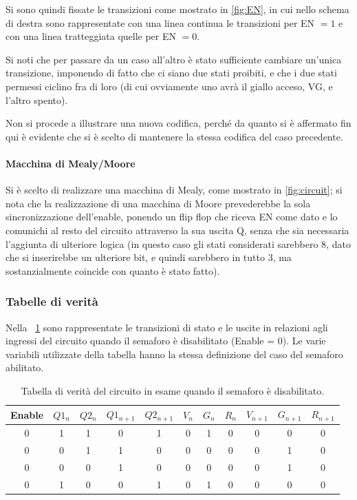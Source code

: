 \documentclass[a4paper,10pt]{article}
\begin{document}
Si sono quindi fissate le transizioni come mostrato in \cref{fig:EN}, in cui nello schema di destra sono rappresentate con una linea continua le transizioni per EN $ = 1 $ e con una linea tratteggiata quelle per EN $ = 0 $.
\newline

Si noti che per passare da un caso all'altro è stato sufficiente cambiare un'unica transizione, imponendo di fatto che ci siano due stati proibiti, e che i due stati permessi ciclino fra di loro (di cui ovviamente uno avrà il giallo acceso, VG, e l'altro spento).
\newline

Non si procede a illustrare una nuova codifica, perché da quanto si è affermato fin qui è evidente che si è scelto di mantenere la stessa codifica del caso precedente.

\paragraph{Macchina di Mealy/Moore} Si è scelto di realizzare una macchina di Mealy, come mostrato in \cref{fig:circuit}; si nota che la realizzazione di una macchina di Moore prevederebbe la sola sincronizzazione dell'enable, ponendo un flip flop che riceva EN come dato e lo comunichi al resto del circuito attraverso la sua uscita Q, senza che sia necessaria l'aggiunta di ulteriore logica (in questo caso gli stati considerati sarebbero $ 8 $, dato che si inserirebbe un ulteriore bit, e quindi sarebbero in tutto $ 3 $, ma sostanzialmente coincide con quanto è stato fatto).

\subsubsection{Tabelle di verità}

Nella \tablename{~\ref{tab:lampe}} sono rappresentate le transizioni di stato e le uscite in relazioni agli ingressi del circuito quando il semaforo è disabilitato (Enable = 0). Le varie variabili utilizzate della tabella hanno la stessa definizione del caso del semaforo abilitato.
 
 \begin{table}[H]
	\centering
	\begin{tabular}{c|cc|cc|ccc|ccc}
	\hline
	Enable & $Q1_n$ & $Q2_n$ & $Q1_{n+1}$ & $Q2_{n+1}$ & $V_n$ & $G_n$ & $R_n$ & $V_{n+1}$ & $G_{n+1}$ & $R_{n+1}$ \\
	\hline
	0 & 1 & 1 & 0 & 1 & 0 & 1 & 0 & 0 & 0 & 0 \\
	0 & 0 & 1 & 1 & 0 & 0 & 0 & 0 & 0 & 1 & 0 \\
	0 & 0 & 0 & 1 & 0 & 0 & 0 & 0 & 0 & 1 & 0 \\
	0 & 1 & 0 & 0 & 1 & 0 & 1 & 0 & 0 & 0 & 0 \\
	\hline
		\end{tabular}
	\caption{Tabella di verità del circuito in esame quando il semaforo è disabilitato.}
	\label{tab:lampe}
\end{table}
\end{document}

